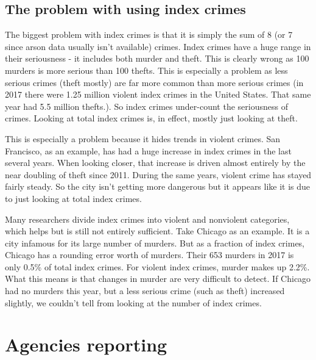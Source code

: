 \documentclass[
  12pt,
  openany]{book}
\begin{document}
\hypertarget{the-problem-with-using-index-crimes}{%
\subsection{The problem with using index crimes}\label{the-problem-with-using-index-crimes}}

The biggest problem with index crimes is that it is simply the sum of 8 (or 7 since arson data usually isn't available) crimes. Index crimes have a huge range in their seriousness - it includes both murder and theft. This is clearly wrong as 100 murders is more serious than 100 thefts. This is especially a problem as less serious crimes (theft mostly) are far more common than more serious crimes (in 2017 there were 1.25 million violent index crimes in the United States. That same year had 5.5 million thefts.). So index crimes under-count the seriousness of crimes. Looking at total index crimes is, in effect, mostly just looking at theft.

This is especially a problem because it hides trends in violent crimes. San Francisco, as an example, has had a huge increase in index crimes in the last several years. When looking closer, that increase is driven almost entirely by the near doubling of theft since 2011. During the same years, violent crime has stayed fairly steady. So the city isn't getting more dangerous but it appears like it is due to just looking at total index crimes.

Many researchers divide index crimes into violent and nonviolent categories, which helps but is still not entirely sufficient. Take Chicago as an example. It is a city infamous for its large number of murders. But as a fraction of index crimes, Chicago has a rounding error worth of murders. Their 653 murders in 2017 is only 0.5\% of total index crimes. For violent index crimes, murder makes up 2.2\%. What this means is that changes in murder are very difficult to detect. If Chicago had no murders this year, but a less serious crime (such as theft) increased slightly, we couldn't tell from looking at the number of index crimes.

\hypertarget{agencies-reporting}{%
\section{Agencies reporting}\label{agencies-reporting}}
\end{document}
